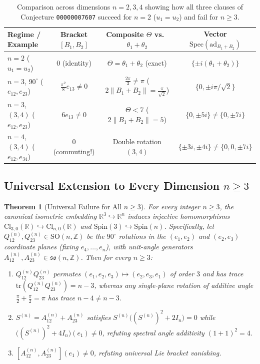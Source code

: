 \documentclass[11pt]{article}
\newtheorem{theorem}{Theorem}[section]
\theoremstyle{definition}
\newcommand{\Cl}{\mathrm{Cl}}
\newcommand{\Spin}{\mathrm{Spin}}
\newcommand{\SO}{\mathrm{SO}}
\newcommand{\solie}{\mathfrak{so}}
\newcommand{\Spec}{\mathrm{Spec}}
\newcommand{\ad}{\mathrm{ad}}
\newcommand{\tr}{\mathrm{tr}}
\begin{document}
\begin{table}[ht]
\centering
\small
\setlength{\tabcolsep}{5pt}
\renewcommand{\arraystretch}{1.25}
\begin{tabular}{|l|c|c|c|}
\hline
\textbf{Regime / Example} & \textbf{Bracket $[B_1, B_2]$} &
\textbf{Composite $\Theta$ vs.\ $\theta_1 + \theta_2$} &
\textbf{Vector $\Spec(\ad_{B_1 + B_2})$} \\
\hline
$n = 2$ ($u_1 = u_2$) & $0$ (identity) &
$\Theta = \theta_1 + \theta_2$ (exact) & $\{\pm i(\theta_1 + \theta_2)\}$ \\
\hline
$n = 3$, $90^\circ$ ($e_{12}, e_{23}$) & $\frac{\pi^2}{8} e_{13} \neq 0$ &
$\frac{2\pi}{3} \neq \pi$ ($2\|B_1+B_2\| = \frac{\pi}{\sqrt{2}}$) &
$\{0, \pm i\pi/\sqrt{2}\}$ \\
\hline
$n = 3$, $(3,4)$ ($e_{12}, e_{23}$) & $6 e_{13} \neq 0$ &
$\Theta < 7$ ($2\|B_1+B_2\| = 5$) & $\{0, \pm 5i\} \neq \{0, \pm 7i\}$ \\
\hline
$n = 4$, $(3,4)$ ($e_{12}, e_{34}$) & $0$ (commuting!) &
Double rotation $(3, 4)$ & $\{\pm 3i, \pm 4i\} \neq \{0,0,\pm 7i\}$ \\
\hline
\end{tabular}
\caption{Comparison across dimensions $n = 2, 3, 4$ showing how all three clauses of
Conjecture \texttt{00000007607} succeed for $n = 2$ ($u_1 = u_2$) and fail for $n \ge 3$.}
\label{tab:comparison}
\end{table}

\subsection{Universal Extension to Every Dimension \texorpdfstring{$n \ge 3$}{n >= 3}}

\begin{theorem}[Universal Failure for All $n \ge 3$]\label{thm:universal-n}
For every integer $n \ge 3$, the canonical isometric embedding $\mathbb{R}^3 \hookrightarrow
\mathbb{R}^n$ induces injective homomorphisms $\Cl_{3,0}(\mathbb{R}) \hookrightarrow
\Cl_{n,0}(\mathbb{R})$ and $\Spin(3) \hookrightarrow \Spin(n)$. Specifically, let
$Q_{12}^{(n)}, Q_{23}^{(n)} \in \SO(n, \mathbb{Z})$ be the $90^\circ$ rotations in the
$(e_1, e_2)$ and $(e_2, e_3)$ coordinate planes (fixing $e_4, \dots, e_n$), with unit-angle
generators $A_{12}^{(n)}, A_{23}^{(n)} \in \solie(n, \mathbb{Z})$. Then for every $n \ge 3$:
\begin{enumerate}
  \item $Q_{12}^{(n)} Q_{23}^{(n)}$ permutes $(e_1, e_2, e_3) \mapsto (e_2, e_3, e_1)$ of
    order $3$ and has trace $\tr(Q_{12}^{(n)} Q_{23}^{(n)}) = n - 3$, whereas any single-plane
    rotation of additive angle $\frac{\pi}{2} + \frac{\pi}{2} = \pi$ has trace $n - 4 \neq n - 3$.
  \item $S^{(n)} = A_{12}^{(n)} + A_{23}^{(n)}$ satisfies $S^{(n)}\bigl((S^{(n)})^2 + 2I_n\bigr) = 0$
    while $\bigl((S^{(n)})^2 + 4I_n\bigr)(e_1) \neq 0$, refuting spectral angle additivity
    $(1 + 1)^2 = 4$.
  \item $[A_{12}^{(n)}, A_{23}^{(n)}](e_1) \neq 0$, refuting universal Lie bracket vanishing.
\end{enumerate}
\end{theorem}
\end{document}
